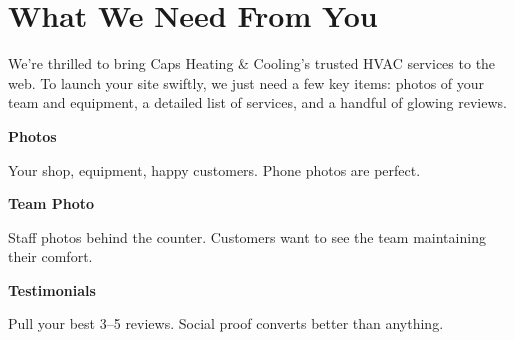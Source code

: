 \documentclass[11pt,letterpaper]{article}
\begin{document}
\vspace{0.2em}

\section*{What We Need From You}

We’re thrilled to bring Caps Heating \& Cooling’s trusted HVAC services to the web. To launch your site swiftly, we just need a few key items: photos of your team and equipment, a detailed list of services, and a handful of glowing reviews.

\vspace{0.12em}

\noindent\begin{minipage}[t]{0.48\textwidth}
\begin{tcolorbox}[colframe=accent-teal, boxrule=1pt, left=0.7em, right=0.7em, top=0.5em, bottom=0.5em, arc=4pt, boxsep=0pt]
{\bfseries\small\color{accent-teal}Photos}

\vspace{0.15em}

{\small Your shop, equipment, happy customers. Phone photos are perfect.}
\end{tcolorbox}

\vspace{0.1em}

\begin{tcolorbox}[colframe=accent-teal, boxrule=1pt, left=0.7em, right=0.7em, top=0.5em, bottom=0.5em, arc=4pt, boxsep=0pt]
{\bfseries\small\color{accent-teal}Team Photo}

\vspace{0.15em}

{\small Staff photos behind the counter. Customers want to see the team maintaining their comfort.}
\end{tcolorbox}

\vspace{0.1em}

\begin{tcolorbox}[colframe=accent-teal, boxrule=1pt, left=0.7em, right=0.7em, top=0.5em, bottom=0.5em, arc=4pt, boxsep=0pt]
{\bfseries\small\color{accent-teal}Testimonials}

\vspace{0.15em}

{\small Pull your best 3--5 reviews. Social proof converts better than anything.}
\end{tcolorbox}
\end{minipage}
\hfill
\end{document}
